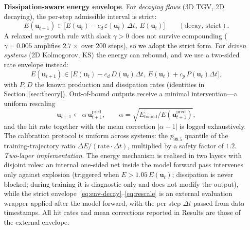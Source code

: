 \documentclass[11pt,a4paper]{article}
\newcommand{\bu}{\bm{u}}
\newcommand{\Ex}{E}
\begin{document}
\textbf{Dissipation-aware energy envelope}\label{sec:envelope}. For \emph{decaying flows} (3D TGV, 2D decaying), the per-step admissible interval is strict:
\begin{equation}
\Ex(\bu_{t+1})\in\big[\Ex(\bu_t)-c_d\,\varepsilon(\bu_t)\,\Delta t,\ \Ex(\bu_t)\big]\qquad(\text{decay, strict}).
\label{eq:env-decay}
\end{equation}
A relaxed no-growth rule with slack $\gamma>0$ does not survive compounding ($\gamma=0.005$ amplifies $2.7\times$ over 200 steps), so we adopt the strict form. For \emph{driven systems} (2D Kolmogorov, KS) the energy can rebound, and we use a two-sided rate envelope instead:
\begin{equation}
\Ex(\bu_{t+1})\in\big[\Ex(\bu_t)-c_d\,D(\bu_t)\Delta t,\ \Ex(\bu_t)+c_p\,P(\bu_t)\Delta t\big],
\label{eq:env-driven}
\end{equation}
with $P,D$ the known production and dissipation rates (identities in Section~\ref{sec:theory}). Out-of-bound outputs receive a minimal intervention---a uniform rescaling
\begin{equation}
\bu_{t+1}\leftarrow \alpha\,\bu_{t+1}^{\mathrm{pred}},\qquad \alpha=\sqrt{\Ex_{\mathrm{bound}}/\Ex(\bu_{t+1}^{\mathrm{pred}})},
\label{eq:rescale}
\end{equation}
and the hit rate together with the mean correction $|\alpha-1|$ is logged exhaustively. The calibration protocol is uniform across systems: the $p_{99.5}$ quantile of the training-trajectory ratio $\Delta\Ex/(\mathrm{rate}\cdot\Delta t)$, multiplied by a safety factor of $1.2$.
\emph{Two-layer implementation}. The energy mechanism is realised in two layers with disjoint roles: an internal one-sided net inside the model forward pass intervenes only against explosion (triggered when $\Ex>1.05\,\Ex(\bu_t)$; dissipation is never blocked; during training it is diagnostic-only and does not modify the output), while the strict envelope~\eqref{eq:env-decay}--\eqref{eq:rescale} is an external evaluation wrapper applied after the model forward, with the per-step $\Delta t$ passed from data timestamps. All hit rates and mean corrections reported in Results are those of the external envelope.
\end{document}
